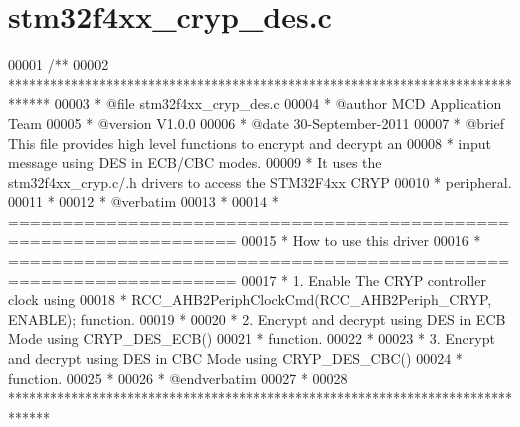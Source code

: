 \section{stm32f4xx\+\_\+cryp\+\_\+des.\+c}
\label{stm32f4xx__cryp__des_8c_source}

\begin{DoxyCode}
00001 \textcolor{comment}{/**}
00002 \textcolor{comment}{  ******************************************************************************}
00003 \textcolor{comment}{  * @file    stm32f4xx\_cryp\_des.c}
00004 \textcolor{comment}{  * @author  MCD Application Team}
00005 \textcolor{comment}{  * @version V1.0.0}
00006 \textcolor{comment}{  * @date    30-September-2011}
00007 \textcolor{comment}{  * @brief   This file provides high level functions to encrypt and decrypt an }
00008 \textcolor{comment}{  *          input message using DES in ECB/CBC modes.}
00009 \textcolor{comment}{  *          It uses the stm32f4xx\_cryp.c/.h drivers to access the STM32F4xx CRYP}
00010 \textcolor{comment}{  *          peripheral.}
00011 \textcolor{comment}{  *}
00012 \textcolor{comment}{  *  @verbatim}
00013 \textcolor{comment}{  *}
00014 \textcolor{comment}{  *          ===================================================================}
00015 \textcolor{comment}{  *                                   How to use this driver}
00016 \textcolor{comment}{  *          ===================================================================}
00017 \textcolor{comment}{  *          1. Enable The CRYP controller clock using }
00018 \textcolor{comment}{  *            RCC\_AHB2PeriphClockCmd(RCC\_AHB2Periph\_CRYP, ENABLE); function.}
00019 \textcolor{comment}{  *}
00020 \textcolor{comment}{  *          2. Encrypt and decrypt using DES in ECB Mode using CRYP\_DES\_ECB()}
00021 \textcolor{comment}{  *             function.}
00022 \textcolor{comment}{  *}
00023 \textcolor{comment}{  *          3. Encrypt and decrypt using DES in CBC Mode using CRYP\_DES\_CBC()}
00024 \textcolor{comment}{  *             function.}
00025 \textcolor{comment}{  *}
00026 \textcolor{comment}{  *  @endverbatim}
00027 \textcolor{comment}{  *}
00028 \textcolor{comment}{  ******************************************************************************}

\end{DoxyCode}

